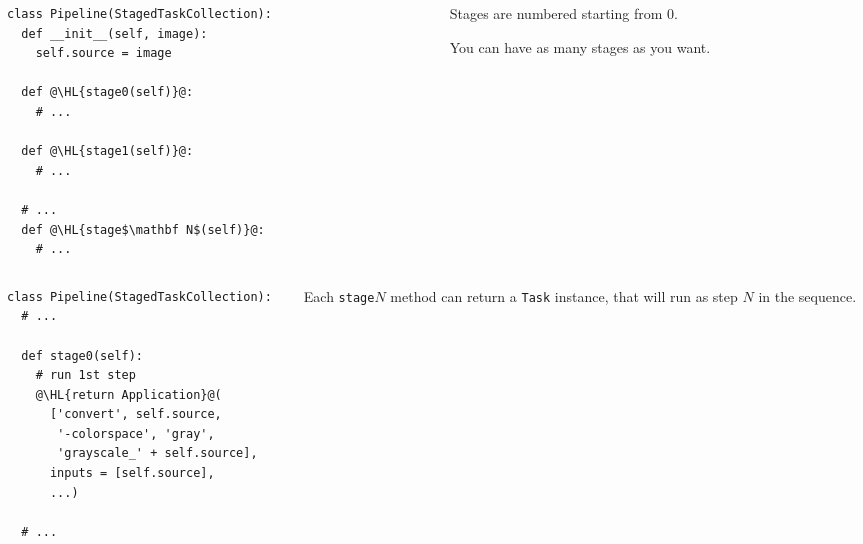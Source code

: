 \documentclass[english,serif,mathserif,xcolor=pdftex,dvipsnames,table]{beamer}
\begin{document}
\begin{frame}[fragile]
  \begin{columns}[c]
    \begin{column}{0.6\textwidth}
      \begin{lstlisting}
class Pipeline(StagedTaskCollection):
  def __init__(self, image):
    self.source = image

  def @\HL{stage0(self)}@:
    # ...

  def @\HL{stage1(self)}@:
    # ...

  # ...
  def @\HL{stage$\mathbf N$(self)}@:
    # ...
      \end{lstlisting}
    \end{column}
    \begin{column}{0.4\textwidth}
      \raggedleft

      Stages are numbered starting from $0$.

      \+
      You can have as many stages as you want.
    \end{column}
  \end{columns}
\end{frame}


\begin{frame}[fragile]
  \begin{columns}[c]
    \begin{column}{0.6\textwidth}
      \begin{lstlisting}
class Pipeline(StagedTaskCollection):
  # ...

  def stage0(self):
    # run 1st step
    @\HL{return Application}@(
      ['convert', self.source, 
       '-colorspace', 'gray',
       'grayscale_' + self.source],
      inputs = [self.source],
      ...)

  # ...
      \end{lstlisting}
    \end{column}
    \begin{column}{0.4\textwidth}
      \raggedleft 

      Each \texttt{stage$N$} method can return a \texttt{Task}
      instance, that will run as step $N$ in the sequence.
    \end{column}
  \end{columns}
\end{frame}
\end{document}
